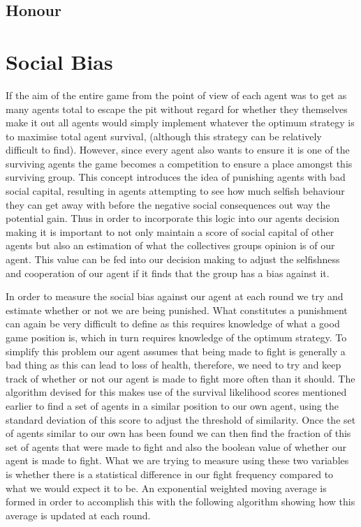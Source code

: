 \subsection{Honour}
\label{subsection:honour}

\section{Social Bias}

If the aim of the entire game from the point of view of each agent was to get as many agents total to escape the pit without regard for whether they themselves make it out all agents would simply implement whatever the optimum strategy is to maximise total agent survival, (although this strategy can be relatively difficult to find). However, since every agent also wants to ensure it is one of the surviving agents the game becomes a  competition to ensure a place amongst this surviving group. This concept introduces the idea of punishing agents with bad social capital, resulting in agents attempting to see how much selfish behaviour they can get away with before the negative social consequences out way the potential gain. Thus in order to incorporate this logic into our agents decision making it is important to not only maintain a score of social capital of other agents but also an estimation of what the collectives groups opinion is of our agent. This value can be fed into our decision making to adjust the selfishness and cooperation of our agent if it finds that the group has a bias against it. 

In order to measure the social bias against our agent at each round we try and estimate whether or not we are being punished. What constitutes a punishment can again be very difficult to define as this requires knowledge of what a good game position is, which in turn requires knowledge of the optimum strategy. To simplify this problem our agent assumes that being made to fight is generally a bad thing as this can lead to loss of health, therefore, we need to try and keep track of whether or not our agent is made to fight more often than it should. The algorithm devised for this makes use of the survival likelihood scores mentioned earlier to find a set of agents in a similar position to our own agent, using the standard deviation of this score to adjust the threshold of similarity. Once the set of agents similar to our own has been found we can then find the fraction of this set of agents that were made to fight and also the boolean value of whether our agent is made to fight. What we are trying to measure using these two variables is whether there is a statistical difference in our fight frequency compared to what we would expect it to be. 
An exponential weighted moving average is formed in order to accomplish this with the following algorithm showing how this average is updated at each round. 


